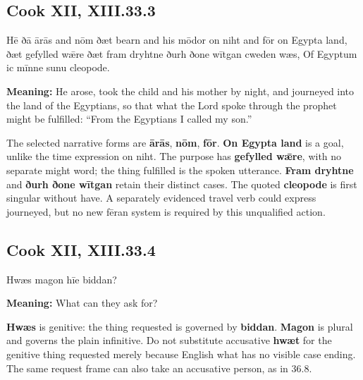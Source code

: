 \par\begin{minipage}{\linewidth}\raggedright
\subsection*{Cook XII, XIII.33.3}

Hē ðā ārās and nōm ðæt bearn and his mōdor on niht and fōr on Egypta land, ðæt gefylled wǣre ðæt fram dryhtne ðurh ðone wītgan cweden wæs, Of Egyptum ic mīnne sunu cleopode.

\textbf{Meaning:} He arose, took the child and his mother by night, and journeyed into the land of the Egyptians, so that what the Lord spoke through the prophet might be fulfilled: “From the Egyptians I called my son.”

The selected narrative forms are \textbf{ārās}, \textbf{nōm}, \textbf{fōr}. \textbf{On Egypta land} is a goal, unlike the time expression on niht. The purpose has \textbf{gefylled wǣre}, with no separate might word; the thing fulfilled is the spoken utterance. \textbf{Fram dryhtne} and \textbf{ðurh ðone wītgan} retain their distinct cases. The quoted \textbf{cleopode} is first singular without have. A separately evidenced travel verb could express journeyed, but no new fēran system is required by this unqualified action.

\end{minipage}\par\addvspace{4pt}

\par\begin{minipage}{\linewidth}\raggedright
\subsection*{Cook XII, XIII.33.4}

Hwæs magon hīe biddan?

\textbf{Meaning:} What can they ask for?

\textbf{Hwæs} is genitive: the thing requested is governed by \textbf{biddan}. \textbf{Magon} is plural and governs the plain infinitive. Do not substitute accusative \textbf{hwæt} for the genitive thing requested merely because English what has no visible case ending. The same request frame can also take an accusative person, as in 36.8.

\end{minipage}\par\addvspace{4pt}

